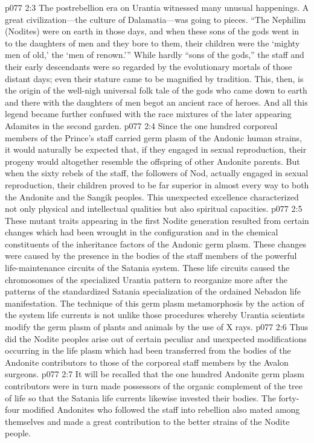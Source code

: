 \vs p077 2:3 The postrebellion era on Urantia witnessed many unusual happenings. A great civilization---the culture of Dalamatia---was going to pieces. “The Nephilim (Nodites) were on earth in those days, and when these sons of the gods went in to the daughters of men and they bore to them, their children were the ‘mighty men of old,’ the ‘men of renown.’” While hardly “sons of the gods,” the staff and their early descendants were so regarded by the evolutionary mortals of those distant days; even their stature came to be magnified by tradition. This, then, is the origin of the well\hyp{}nigh universal folk tale of the gods who came down to earth and there with the daughters of men begot an ancient race of heroes. And all this legend became further confused with the race mixtures of the later appearing Adamites in the second garden.
\vs p077 2:4 Since the one hundred corporeal members of the Prince’s staff carried germ plasm of the Andonic human strains, it would naturally be expected that, if they engaged in sexual reproduction, their progeny would altogether resemble the offspring of other Andonite parents. But when the sixty rebels of the staff, the followers of Nod, actually engaged in sexual reproduction, their children proved to be far superior in almost every way to both the Andonite and the Sangik peoples. This unexpected excellence characterized not only physical and intellectual qualities but also spiritual capacities.
\vs p077 2:5 These mutant traits appearing in the first Nodite generation resulted from certain changes which had been wrought in the configuration and in the chemical constituents of the inheritance factors of the Andonic germ plasm. These changes were caused by the presence in the bodies of the staff members of the powerful life\hyp{}maintenance circuits of the Satania system. These life circuits caused the chromosomes of the specialized Urantia pattern to reorganize more after the patterns of the standardized Satania specialization of the ordained Nebadon life manifestation. The technique of this germ plasm metamorphosis by the action of the system life currents is not unlike those procedures whereby Urantia scientists modify the germ plasm of plants and animals by the use of X rays.
\vs p077 2:6 Thus did the Nodite peoples arise out of certain peculiar and unexpected modifications occurring in the life plasm which had been transferred from the bodies of the Andonite contributors to those of the corporeal staff members by the Avalon surgeons.
\pc \vs p077 2:7 It will be recalled that the one hundred Andonite germ plasm contributors were in turn made possessors of the organic complement of the tree of life so that the Satania life currents likewise invested their bodies. The forty\hyp{}four modified Andonites who followed the staff into rebellion also mated among themselves and made a great contribution to the better strains of the Nodite people.
